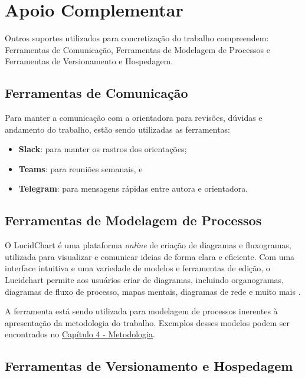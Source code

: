 
\section{Apoio Complementar} \label{complementar}

Outros suportes utilizados para concretização do trabalho compreendem: Ferramentas de Comunicação, Ferramentas de Modelagem de Processos e Ferramentas de Versionamento e Hospedagem.

\subsection{Ferramentas de Comunicação}

Para manter a comunicação com a orientadora para revisões, dúvidas e andamento do trabalho, estão sendo utilizadas as ferramentas:
\begin{itemize}
    \item \textbf{Slack}: para manter os rastros dos orientações;
    \item \textbf{Teams}: para reuniões semanais, e
    \item \textbf{Telegram}: para mensagens rápidas entre autora e orientadora.
\end{itemize}

\subsection{Ferramentas de Modelagem de Processos}

O LucidChart é uma plataforma \textit{online} de criação de diagramas e fluxogramas, utilizada para visualizar e comunicar ideias de forma clara e eficiente. Com uma interface intuitiva e uma variedade de modelos e ferramentas de edição, o Lucidchart permite aos usuários criar de diagramas, incluindo organogramas, diagramas de fluxo de processo, mapas mentais, diagramas de rede e muito mais \cite{LucidChart}.

A ferramenta está sendo utilizada para modelagem de processos inerentes à apresentação da metodologia do trabalho. Exemplos desses modelos podem ser encontrados no \hyperref[chap:Metodologia]{Capítulo 4 - Metodologia}.

\subsection{Ferramentas de Versionamento e Hospedagem} 

